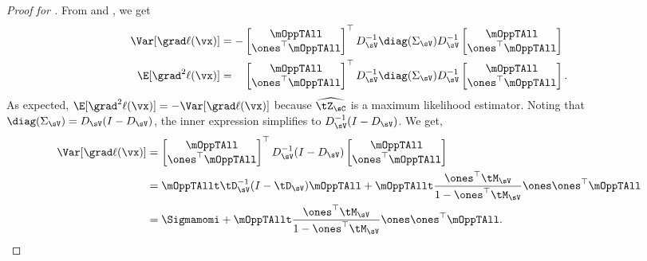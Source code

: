 \begin{proof}[Proof for ]
From  and , we get
  \begin{align*}
    \Var [\grad \ell(\vx)] &= -
        \begin{bmatrix}
          \mOppTAll \\
          \ones^\top \mOppTAll
        \end{bmatrix}^\top
          D_{\sV}^{-1} \diag(\Sigma_\sV) D_{\sV}^{-1} 
        \begin{bmatrix}
          \mOppTAll \\
          \ones^\top \mOppTAll
        \end{bmatrix} \\
        \E[\grad^2 \ell(\vx)] 
        &= \hphantom{-}
        \begin{bmatrix}
          \mOppTAll \\
          \ones^\top \mOppTAll
        \end{bmatrix}^\top
          D_{\sV}^{-1} \diag(\Sigma_\sV) D_{\sV}^{-1} 
        \begin{bmatrix}
          \mOppTAll \\
          \ones^\top \mOppTAll
        \end{bmatrix}.
  \end{align*}
As expected, $\E[\grad^2 \ell(\vx)] = -\Var [\grad \ell(\vx)]$ because
$\widehat{\tZ_\sC}$ is a maximum likelihood estimator. 
Noting that $\diag(\Sigma_\sV) = D_\sV (I - D_\sV)$, the inner
  expression simplifies to $D_\sV^{-1} (I - D_\sV)$. We get,
\begin{align*}
  \Var [\grad \ell(\vx)] &=
      \begin{bmatrix}
        \mOppTAll \\
        \ones^\top \mOppTAll
      \end{bmatrix}^\top
        D_{\sV}^{-1} (I - D_\sV) 
      \begin{bmatrix}
        \mOppTAll \\
        \ones^\top \mOppTAll
      \end{bmatrix} \\
   &=
    \mOppTAllt \tD_{\sV}^{-1} (I - \tD_\sV) \mOppTAll + \mOppTAllt \frac{\ones^\top \tM_\sV}{1 - \ones^\top \tM_\sV} \ones\ones^\top \mOppTAll \\
   &= {\Sigmamomi} + \mOppTAllt \frac{\ones^\top \tM_\sV}{1 - \ones^\top \tM_\sV} \ones\ones^\top \mOppTAll.
\end{align*}


\end{proof}
